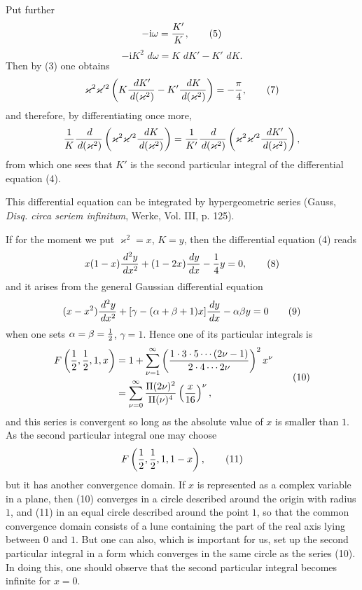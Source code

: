 \documentclass[11pt]{article}
\providecommand{\dd}{\,d}
\providecommand{\ii}{\mathrm{i}}
\begin{document}
Put further
\begin{equation}
-\ii\omega={K'\over K},
\tag{5}
\end{equation}
\begin{equation}
-\ii K^2\,\dd\omega=K\,\dd K'-K'\,\dd K.
\tag{6}
\end{equation}
Then by (3) one obtains
\begin{equation}
\varkappa^2\varkappa'^2\left(K{\dd K'\over\dd(\varkappa^2)}-K'{\dd K\over\dd(\varkappa^2)}\right)
=-{\pi\over4},
\tag{7}
\end{equation}
and therefore, by differentiating once more,
\[
{1\over K}{\dd\over\dd(\varkappa^2)}
\left(\varkappa^2\varkappa'^2{\dd K\over\dd(\varkappa^2)}\right)
={1\over K'}{\dd\over\dd(\varkappa^2)}
\left(\varkappa^2\varkappa'^2{\dd K'\over\dd(\varkappa^2)}\right),
\]
from which one sees that $K'$ is the second particular integral of the differential equation (4).

This differential equation can be integrated by hypergeometric series (Gauss, \emph{Disq. circa seriem infinitum}, Werke, Vol. III, p. 125).

If for the moment we put $\varkappa^2=x$, $K=y$, then the differential equation (4) reads
\begin{equation}
x(1-x){\dd^2y\over\dd x^2}+(1-2x){\dd y\over\dd x}-{1\over4}y=0,
\tag{8}
\end{equation}
and it arises from the general Gaussian differential equation
\begin{equation}
(x-x^2){\dd^2y\over\dd x^2}+[\gamma-(\alpha+\beta+1)x]{\dd y\over\dd x}-\alpha\beta y=0
\tag{9}
\end{equation}
when one sets $\alpha=\beta={1\over2}$, $\gamma=1$. Hence one of its particular integrals is
\begin{equation}
\begin{aligned}
F\left({1\over2},{1\over2},1,x\right)
&=1+\sum_{\nu=1}^{\infty}\left({1\cdot3\cdot5\cdots(2\nu-1)\over2\cdot4\cdots2\nu}\right)^2x^\nu\\
&=\sum_{\nu=0}^{\infty}{\Pi(2\nu)^2\over\Pi(\nu)^4}\left({x\over16}\right)^\nu,
\end{aligned}
\tag{10}
\end{equation}
and this series is convergent so long as the absolute value of $x$ is smaller than $1$. As the second particular integral one may choose
\begin{equation}
F\left({1\over2},{1\over2},1,1-x\right),
\tag{11}
\end{equation}
but it has another convergence domain. If $x$ is represented as a complex variable in a plane, then (10) converges in a circle described around the origin with radius $1$, and (11) in an equal circle described around the point $1$, so that the common convergence domain consists of a lune containing the part of the real axis lying between $0$ and $1$. But one can also, which is important for us, set up the second particular integral in a form which converges in the same circle as the series (10). In doing this, one should observe that the second particular integral becomes infinite for $x=0$.
\end{document}
